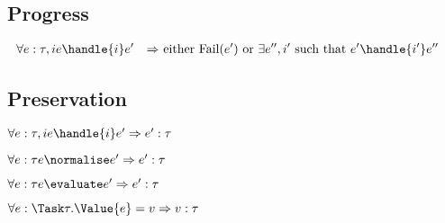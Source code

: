 \subsection{Progress}

\begin{align*}
  \forall e:\tau,i & e \handle{i} e' &\implies& \text{ either Fail}(e') \text{ or } \exists e'',i' \text{ such that } e'\handle{i'}e''&\\
\end{align*}

\subsection{Preservation}

\begin{theorem}
  $\forall e:\tau,i  e \handle{i} e' \implies e':\tau$
\end{theorem}

\begin{theorem}
    $\forall e:\tau  e \normalise e' \implies e':\tau$
\end{theorem}

\begin{theorem}
      $\forall e:\tau  e \evaluate e' \implies e':\tau$
      \label{thmpreseval}
\end{theorem}

\begin{lemma}
  $\forall e:\Task\tau . \Value{e}=v \implies v:\tau$
\end{lemma}

